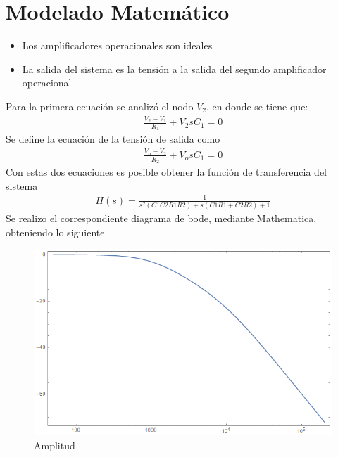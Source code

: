 \documentclass[10pt,a4paper]{article} %
\begin{document}
\section{Modelado Matemático}
\begin{itemize}
	\item Los amplificadores operacionales son ideales
	\item La salida del sistema es la tensión a la salida del segundo amplificador operacional
\end{itemize}
Para la primera ecuación se analizó el nodo $V_2$, en donde se tiene que:
\begin{align}
\frac{V_2-V_1}{R_1}+V_2sC_1=0
\end{align}
Se define la ecuación de la tensión de salida como
\begin{align}
\frac{V_o-V_2}{R_2}+V_osC_1=0
\end{align}
Con estas dos ecuaciones es posible obtener la función de transferencia del sistema
\begin{align}
H(s)=\frac{1}{s^2(C1C2R1R2)+s(C1R1+C2R2)+1}
\end{align}
 Se realizo el correspondiente diagrama de bode, mediante Mathematica, obteniendo lo siguiente
\begin{figure}[H]
\begin{center}
	\includegraphics[scale=0.5]{bode1}
	\caption{Amplitud}
\end{center}
\end{figure}
\end{document}
